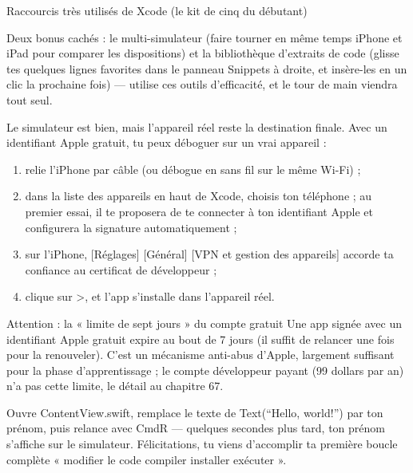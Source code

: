 \begin{center}\small\color{gray}Raccourcis très utilisés de Xcode (le kit de cinq du débutant)\end{center}

Deux bonus cachés : le multi-simulateur (faire tourner en même temps iPhone et iPad pour comparer les dispositions) et la bibliothèque d’extraits de code (glisse tes quelques lignes favorites dans le panneau Snippets à droite, et insère-les en un clic la prochaine fois) — utilise ces outils d’efficacité, et le tour de main viendra tout seul.


Le simulateur est bien, mais l’appareil réel reste la destination finale. Avec un identifiant Apple gratuit, tu peux déboguer sur un vrai appareil :

\begin{enumerate}
  \item relie l’iPhone par câble (ou débogue en sans fil sur le même Wi-Fi) ;
  \item dans la liste des appareils en haut de Xcode, choisis ton téléphone ; au premier essai, il te proposera de te connecter à ton identifiant Apple et configurera la signature automatiquement ;
  \item sur l’iPhone, [Réglages] [Général] [VPN et gestion des appareils] accorde ta confiance au certificat de développeur ;
  \item clique sur >, et l’app s’installe dans l’appareil réel.
\end{enumerate}

\begin{tcbwarn}{Attention : la « limite de sept jours » du compte gratuit}
Une app signée avec un identifiant Apple gratuit expire au bout de 7 jours (il suffit de relancer une fois pour la renouveler). C’est un mécanisme anti-abus d’Apple, largement suffisant pour la phase d’apprentissage ; le compte développeur payant (99 dollars par an) n’a pas cette limite, le détail au chapitre 67.

\end{tcbwarn}



Ouvre ContentView.swift, remplace le texte de Text(“Hello, world!”) par ton prénom, puis relance avec CmdR — quelques secondes plus tard, ton prénom s’affiche sur le simulateur. Félicitations, tu viens d’accomplir ta première boucle complète « modifier le code compiler installer exécuter ».


